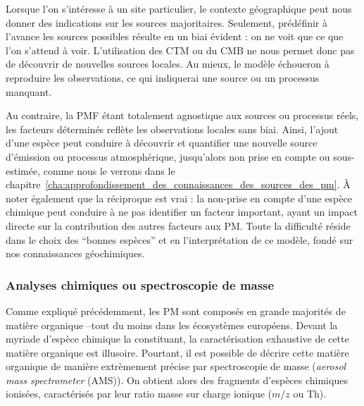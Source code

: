 Lorsque l'on s'intéresse à un site particulier, le contexte géographique peut nous donner
des indications sur les sources majoritaires. Seulement, prédéfinir à l'avance les sources
possibles résulte en un biai évident : on ne voit que ce que l'on s'attend à voir.
L'utilisation des CTM ou du CMB ne nous permet donc pas de découvrir de nouvelles sources
locales. Au mieux, le modèle échoueron à reproduire les observations, ce qui indiquerai
une source ou un processus manquant.

Au contraire, la PMF étant totalement agnostique aux sources ou processus réels, les
facteurs déterminés reflète les observations locales sans biai. Ainsi, l'ajout d'une
espèce peut conduire à découvrir et quantifier une nouvelle source d'émission ou processus
atmosphérique, jusqu'alors non prise en compte ou sous-estimée, comme nous le verrons dans
le chapitre~\ref{cha:approfondissement_des_connaissances_des_sources_des_pm}. À noter
également que la réciproque est vrai : la non-prise en compte d'une espèce chimique peut
conduire à ne pas identifier un facteur important, ayant un impact directe sur la
contribution des autres facteurs aux PM.
Toute la difficulté réside dans le choix des ``bonnes espèces'' et en l'interprétation de
ce modèle, fondé sur nos connaissances géochimiques.

\subsubsection{Analyses chimiques ou spectroscopie de masse}%
\label{ssub:analyses_chimiques_ou_spectroscopie_de_masse}

Comme expliqué précédemment, les PM sont composés en grande majorités de matière organique
--tout du moins dans les écosystèmes européens.  Devant la myriade d'espèce chimique la
constituant, la caractérisation exhaustive de cette matière organique est illusoire.
Pourtant, il est possible de décrire cette matière organique de manière extrèmement
précise par spectroscopie de masse (\textit{aerosol mass spectrometer} (AMS)). On obtient alors des
fragments d'espèces chimiques ionisées, caractérisés par leur ratio masse sur charge ionique
($m/z$ ou Th).

